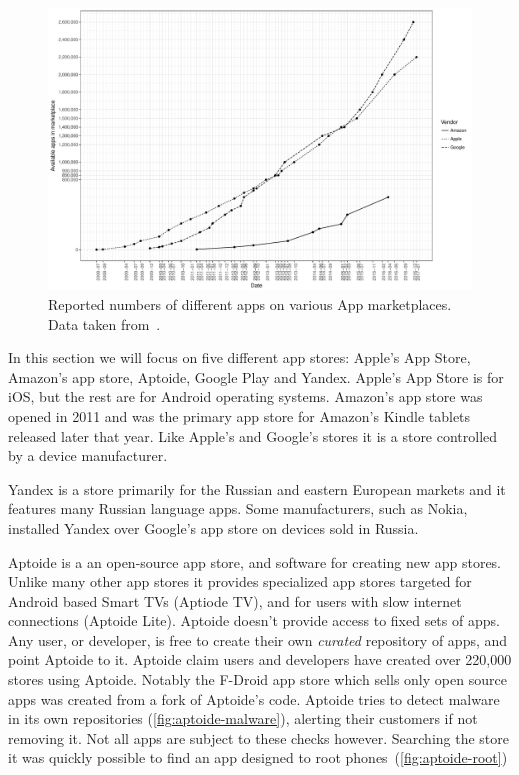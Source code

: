 \documentclass[thesis.tex]{subfiles}
\begin{document}
\begin{figure}
  \includegraphics[width=\textwidth]{figures/app-store-apps.pdf}
  \caption[Reported numbers of different apps on various App marketplaces.]{%
    Reported numbers of different apps on various App marketplaces. Data taken from~\cite{statista_google_nodate,statista_apple_nodate,statista_amazon_nodate}.}
  \label{fig:app-store-apps}
\end{figure}

In this section we will focus on five different app stores: Apple's App Store,
Amazon's app store, Aptoide, Google Play and Yandex.  Apple's App Store is for iOS,
but the rest are for Android operating systems.  
Amazon's app store was opened in 2011 and was the primary app store for Amazon's
Kindle tablets released later that year.  Like Apple's
and Google's stores it is a
store controlled by a device manufacturer.

Yandex is a store primarily for the Russian and eastern European markets
and it features many Russian language apps. Some manufacturers,
such as Nokia, installed Yandex over Google's app store on devices sold in
Russia.

Aptoide is a an open-source app store, and software for creating new
app stores.  Unlike many other app stores it provides specialized app
stores targeted for Android based Smart TVs (Aptiode TV), and for
users with slow internet connections (Aptoide Lite).  Aptoide doesn't
provide access to fixed sets of apps.  Any user, or developer, is free
to create their own \emph{curated} repository of apps, and point
Aptoide to it.  Aptoide claim users and developers have created over
220,000 stores using Aptoide. Notably the F-Droid app store which
sells only open source apps was created from a fork of Aptoide's code.
Aptoide tries to detect malware in its own repositories
(\autoref{fig:aptoide-malware}), alerting their customers if
not removing it.  Not all apps are subject to these checks however.
Searching the store it was quickly possible to find an app designed to
root phones~(\autoref{fig:aptoide-root})
\end{document}
